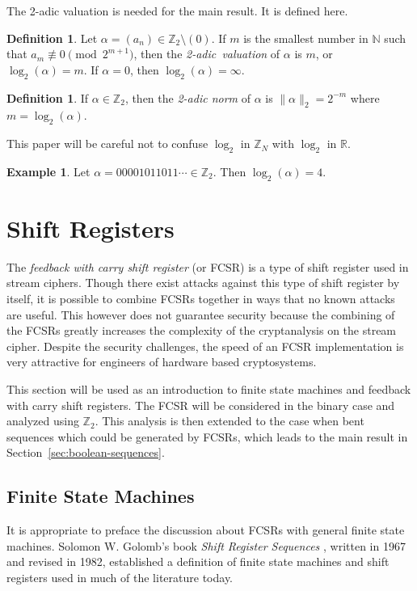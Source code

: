 \documentclass[english]{article}
\def\zzz{\mathbb{Z}}
\def\zzzn{\mathbb{Z}_N}
\def\nnn{\mathbb{N}}
\def\an{(a_n)}
\theoremstyle{plain}
\theoremstyle{definition}
\newtheorem{definition}[theorem]{Definition}%
\newtheorem{example}[theorem]{Example}
\theoremstyle{remark}
\begin{document}
\par The 2-adic valuation is needed for the main result. It is defined here.

\begin{definition}\label{2-adic-val}
  Let $\alpha=\an\in\zzz_2\setminus(0)$. If $m$ is the smallest number in
  $\nnn$ such that $a_m \not\equiv 0 \pmod{2^{m+1}}$, then the {\em 2-adic\ 
  valuation} of $\alpha$ is $m$, or $\log_2(\alpha)=m$. If $\alpha=0$, then
  $\log_2(\alpha)=\infty$.
\end{definition}

\begin{definition}\label{2-adic-norm}
  If $\alpha \in \zzz_2$, then the {\em 2-adic norm} of $\alpha$ is
  $\lVert \alpha \rVert_2 = 2^{-m}$ where $m=\log_2(\alpha)$. 
\end{definition}

\par This paper will be careful not to confuse $\log_2$ in $\zzzn$ with 
$\log_2$ in $\mathbb{R}$.

\begin{example}
  Let $\alpha=00001011011\cdots\in\zzz_2$. Then $\log_2(\alpha)=4$.
\end{example}

\section{Shift Registers}\label{sec:shift-registers}
\par The {\it feedback with carry shift register} (or FCSR) is a type of
shift register used in stream ciphers. Though there exist attacks against
this type of shift register by itself, it is possible to combine FCSRs
together in ways that no known attacks are useful. This however does not
guarantee security because the combining of the FCSRs greatly increases the
complexity of the cryptanalysis on the stream cipher. Despite the security
challenges, the speed of an FCSR implementation is very attractive for
engineers of hardware based cryptosystems.

\par This section will be used as an introduction to finite state machines
and feedback with carry shift registers. The FCSR will be considered in the
binary case and analyzed using $\zzz_2$. This analysis is then extended to
the case when bent sequences which could be generated by FCSRs, which leads to
the main result in Section~\ref{sec:boolean-sequences}.

\subsection{Finite State Machines}
\par It is appropriate to preface the discussion about FCSRs with general finite
state machines. Solomon W. Golomb's book {\em Shift Register Sequences}
\cite{bk:g82}, written in 1967 and revised in 1982, established a definition of
finite state machines and shift registers used in much of the literature today.
\end{document}
